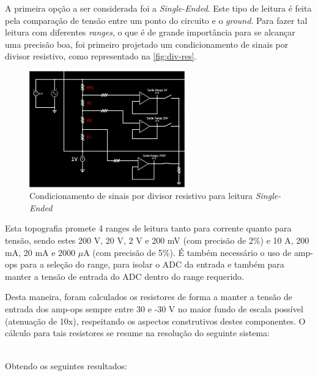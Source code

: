 A primeira opção a ser considerada foi a \textit{Single-Ended}. Este tipo de leitura é feita pela comparação de tensão entre um ponto do circuito e o \textit{ground}. Para fazer tal leitura com diferentes \textit{ranges}, o que é de grande importância para se alcançar uma precisão boa, foi primeiro projetado um condicionamento de sinais por divisor resistivo, como representado na \autoref{fig:div-res}.

\begin{figure}[htb!]
    \caption{Condicionamento de sinais por divisor resistivo para leitura \textit{Single-Ended}}
    \label{fig:div-res}
    \includegraphics[width=0.6\textwidth]{figuras/div-res.png}
    \fonte{}
\end{figure}

Esta topografia promete 4 ranges de leitura tanto para corrente quanto para tensão, sendo estes 200 V, 20 V, 2 V e 200 mV (com precisão de 2\%) e 10 A, 200 mA, 20 mA e 2000 $\mu$A (com precisão de 5\%). É também necessário o uso de \gls{amp-op}s para a seleção do range, para isolar o \gls{ADC} da entrada e também para manter a tensão de entrada do \gls{ADC} dentro do range requerido.

Desta maneira, foram calculados os resistores de forma a manter a tensão de entrada dos \gls{amp-op}s sempre entre 30 e -30 V no maior fundo de escala possível (atenuação de 10x), respeitando os aspectos construtivos destes componentes. O cálculo para tais resistores se resume na resolução do seguinte sistema:

\begin{equation}
    \label{eq01}
    \begin{array}{lcl}
    \end{array}
\end{equation}

Obtendo os seguintes resultados:

\begin{equation}
    \label{eq02}
    \begin{array}{lcl}
    \end{array}
\end{equation}

